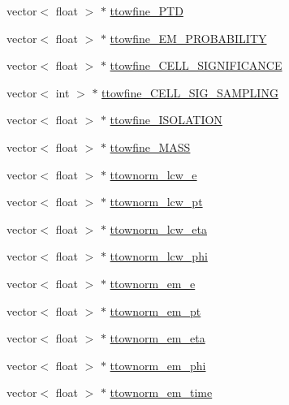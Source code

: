 \begin{DoxyCompactItemize}
\item 
vector$<$ float $>$ $\ast$ \hyperlink{classCollectionTree_aeee970e6f93c0aef0abbc589688d5e30}{ttowfine\+\_\+\+P\+TD}
\item 
vector$<$ float $>$ $\ast$ \hyperlink{classCollectionTree_ae8f7262dcd2f81d1667646a74b3906af}{ttowfine\+\_\+\+E\+M\+\_\+\+P\+R\+O\+B\+A\+B\+I\+L\+I\+TY}
\item 
vector$<$ float $>$ $\ast$ \hyperlink{classCollectionTree_a00ed51661b6ea2136f786e7da7224d49}{ttowfine\+\_\+\+C\+E\+L\+L\+\_\+\+S\+I\+G\+N\+I\+F\+I\+C\+A\+N\+CE}
\item 
vector$<$ int $>$ $\ast$ \hyperlink{classCollectionTree_aa98782b2e0300bdd803d5042057f3231}{ttowfine\+\_\+\+C\+E\+L\+L\+\_\+\+S\+I\+G\+\_\+\+S\+A\+M\+P\+L\+I\+NG}
\item 
vector$<$ float $>$ $\ast$ \hyperlink{classCollectionTree_a4810712ff21756aa299afba63ead1f08}{ttowfine\+\_\+\+I\+S\+O\+L\+A\+T\+I\+ON}
\item 
vector$<$ float $>$ $\ast$ \hyperlink{classCollectionTree_a04742e0c997b761b5e0b289c82c29582}{ttowfine\+\_\+\+M\+A\+SS}
\item 
vector$<$ float $>$ $\ast$ \hyperlink{classCollectionTree_ac1a9a0e7d589137213d805a58b717cd7}{ttownorm\+\_\+lcw\+\_\+e}
\item 
vector$<$ float $>$ $\ast$ \hyperlink{classCollectionTree_a7d381ed8d5087365da800df558ddff02}{ttownorm\+\_\+lcw\+\_\+pt}
\item 
vector$<$ float $>$ $\ast$ \hyperlink{classCollectionTree_af30cfd67db2bc73e21e8c8aaa58548c9}{ttownorm\+\_\+lcw\+\_\+eta}
\item 
vector$<$ float $>$ $\ast$ \hyperlink{classCollectionTree_abfff166a2935f341fe654974ea0de6b7}{ttownorm\+\_\+lcw\+\_\+phi}
\item 
vector$<$ float $>$ $\ast$ \hyperlink{classCollectionTree_a87ee6faca1d1d2f2806103a375ebebcd}{ttownorm\+\_\+em\+\_\+e}
\item 
vector$<$ float $>$ $\ast$ \hyperlink{classCollectionTree_a4d8b6f855f13700f76e79d4e1884c280}{ttownorm\+\_\+em\+\_\+pt}
\item 
vector$<$ float $>$ $\ast$ \hyperlink{classCollectionTree_a7d2d538b6cb20dccf7f94004939f38e9}{ttownorm\+\_\+em\+\_\+eta}
\item 
vector$<$ float $>$ $\ast$ \hyperlink{classCollectionTree_a9a7414022145d29fcaca4128384ac756}{ttownorm\+\_\+em\+\_\+phi}
\item 
vector$<$ float $>$ $\ast$ \hyperlink{classCollectionTree_aacce2915b8451c79cc9ff5c8281414df}{ttownorm\+\_\+em\+\_\+time}

\end{DoxyCompactItemize}

